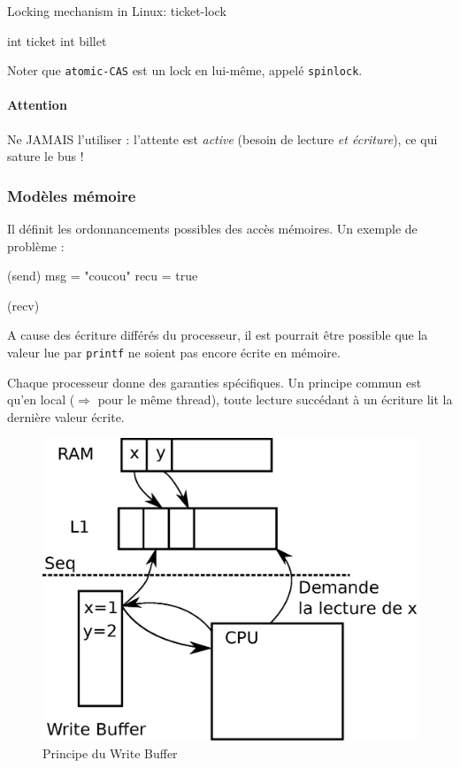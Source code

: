 \documentclass{article}
\begin{document}
Locking mechanism in Linux: ticket-lock\\
\begin{algorithm}[H]
int ticket\;
int billet\;

\end{algorithm}

Noter que \texttt{atomic-CAS} est un lock en lui-même, appelé \texttt{spinlock}.
\begin{algorithm}
\end{algorithm}
\paragraph{Attention} Ne JAMAIS l'utiliser : l'attente est \emph{active} (besoin de lecture \emph{et écriture}), ce qui sature le bus !


\subsubsection{Modèles mémoire}
Il définit les ordonnancements possibles des accès mémoires. Un exemple de problème :

\begin{algorithm}[H]
\Label(send){
	msg = "coucou"\;
	recu = true\;
}

\Label(recv){
}
\end{algorithm}
A cause des écriture différés du processeur, il est pourrait être possible que la valeur lue par \texttt{printf} ne soient pas encore écrite en mémoire.
\bigskip

Chaque processeur donne des garanties spécifiques. Un principe commun est qu'en local ($\Rightarrow$ pour le même thread), toute lecture succédant à un écriture lit la dernière valeur écrite.

\begin{figure}[h]
\centering
\includegraphics[width=0.5\linewidth]{write_buffer.eps}
\caption{\label{fig:write_buffer}Principe du Write Buffer}
\end{figure}
\end{document}
